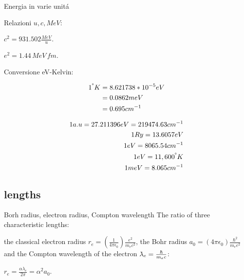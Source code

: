 \begin{frame}{Energia in varie unit\'a}

Relazioni $u,c,MeV$:
 
$c^2=931.502\frac{MeV}{u}$.
 
$e^2=1.44\,MeV\,fm$.
 
Conversione eV-Kelvin:
 
\begin{align*}
1  ^{\degree}K&= 8.621738*10^{-5}  eV \\
&= 0.0862 meV \\
&= 0.695 cm^{-1}
\end{align*}

\begin{align*}
1 a.u=27.211396 eV=219474.63 cm^{-1}\\
1 Ry=13.6057 eV \\
1 eV =8065.54 cm^{-1} \\
1 eV= 11,600  ^{\degree}K\\
1 meV = 8.065 cm^{-1}
\end{align*}
\end{frame}

\subsection{lengths}

\begin{frame}{Borh radius, electron radius, Compton wavelength}
    The ratio of three characteristic lengths:

the classical electron radius $r_e=(\frac{1}{4\pi\epsilon_0})\frac{e^2}{m_ec^2}$, the Bohr radius $a_0=(4\pi\epsilon_0)\frac{\hbar^2}{m_ee^2}$  and the Compton wavelength of the electron $\lambdabar_e=\frac{\hbar}{m_ec}$:

$r_e=\frac{\alpha\lambda_e}{2\pi}=\alpha^2a_0$.
\end{frame}


